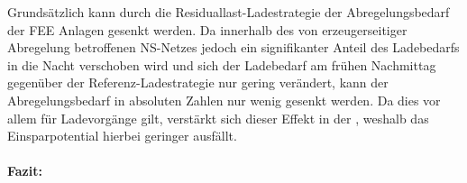 

Grundsätzlich kann durch die Residuallast-Ladestrategie der Abregelungsbedarf der \gls{FEE} Anlagen gesenkt werden.
Da innerhalb des von erzeugerseitiger Abregelung betroffenen \gls{NS}-Netzes jedoch ein signifikanter Anteil des Ladebedarfs in die Nacht verschoben wird und sich der Ladebedarf am frühen Nachmittag gegenüber der Referenz-Ladestrategie nur gering verändert, kann der Abregelungsbedarf in absoluten Zahlen nur wenig gesenkt werden.
Da dies vor allem für Ladevorgänge \zH gilt, verstärkt sich dieser Effekt in der \SzeFirmenparkplatzdot, weshalb das Einsparpotential hierbei geringer ausfällt.


\paragraph{Fazit:}



\clearpage

